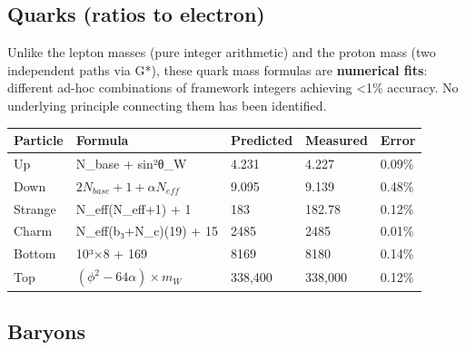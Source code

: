 \documentclass[
  11pt,
  letterpaper,
  twoside,
  openany]{book}
\makeatletter
\let\orig@subsection\subsection
\renewcommand{\subsection}{\needspace{6\baselineskip}\orig@subsection}
\makeatother
\begin{document}
\subsection{Quarks (ratios to
electron)}\label{quarks-ratios-to-electron}

\begin{tcolorbox}[enhanced jigsaw, colbacktitle=quarto-callout-warning-color!10!white, titlerule=0mm, bottomtitle=1mm, bottomrule=.15mm, colback=white, arc=.35mm, breakable, toprule=.15mm, title=\textcolor{quarto-callout-warning-color}{\faExclamationTriangle}\hspace{0.5em}{Epistemic Status: Numerical Fits}, rightrule=.15mm, coltitle=black, leftrule=.75mm, colframe=quarto-callout-warning-color-frame, toptitle=1mm, opacityback=0, opacitybacktitle=0.6, left=2mm]

Unlike the lepton masses (pure integer arithmetic) and the proton mass
(two independent paths via G*), these quark mass formulas are
\textbf{numerical fits}: different ad-hoc combinations of framework
integers achieving \textless1\% accuracy. No underlying principle
connecting them has been identified.

\end{tcolorbox}

\begin{longtable}[]{@{}lllll@{}}
\toprule\noalign{}
Particle & Formula & Predicted & Measured & Error \\
\midrule\noalign{}
\endhead
\bottomrule\noalign{}
\endlastfoot
Up & N\_base + sin²θ\_W & 4.231 & 4.227 & 0.09\% \\
Down & \(2N_{base} + 1 + \alpha N_{eff}\) & 9.095 & 9.139 & 0.48\% \\
Strange & N\_eff(N\_eff+1) + 1 & 183 & 182.78 & 0.12\% \\
Charm & N\_eff(b₃+N\_c)(19) + 15 & 2485 & 2485 & 0.01\% \\
Bottom & 10³×8 + 169 & 8169 & 8180 & 0.14\% \\
Top & \((\phi^2 - 64\alpha) \times m_W\) & 338,400 & 338,000 & 0.12\% \\
\end{longtable}

\subsection{Baryons}\label{baryons}
\end{document}
